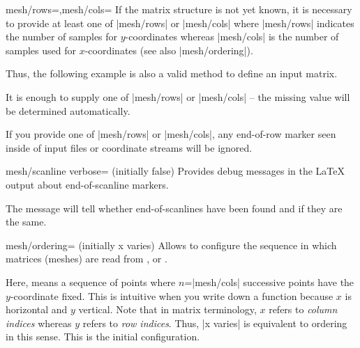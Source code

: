 {\begin{pgfplotskeylist}{mesh/rows=,mesh/cols=}
    If the matrix structure is not yet known, it is necessary to provide at
    least one of |mesh/rows| or |mesh/cols| where |mesh/rows| indicates the
    number of samples for $y$-coordinates whereas |mesh/cols| is the number of
    samples used for $x$-coordinates (see also |mesh/ordering|).

    Thus, the following example is also a valid method to define an input
    matrix.
\begin{codeexample}[]
\end{codeexample}

    It is enough to supply one of |mesh/rows| or |mesh/cols| -- the missing
    value will be determined automatically.

    If you provide one of |mesh/rows| or |mesh/cols|, any end-of-row marker
    seen inside of input files or coordinate streams will be ignored.
\end{pgfplotskeylist}

\begin{pgfplotskeylist}{mesh/scanline verbose= (initially false)}
    Provides debug messages in the \LaTeX{} output about end-of-scanline
    markers.

    The message will tell whether end-of-scanlines have been found and if they
    are the same.
\end{pgfplotskeylist}

\begin{pgfplotskey}{mesh/ordering= (initially x varies)}
    Allows to configure the sequence in which matrices (meshes) are read from
    ,  or
    .

    Here,  means a sequence of points where
    $n$=|mesh/cols| successive points have the $y$-coordinate fixed. This is
    intuitive when you write down a function because $x$ is horizontal and $y$
    vertical. Note that in matrix terminology, $x$ refers to \emph{column
    indices} whereas $y$ refers to \emph{row indices}. Thus, |x varies| is
    equivalent to  ordering in this sense. This is the
    initial configuration.


\end{pgfplotskey}}
